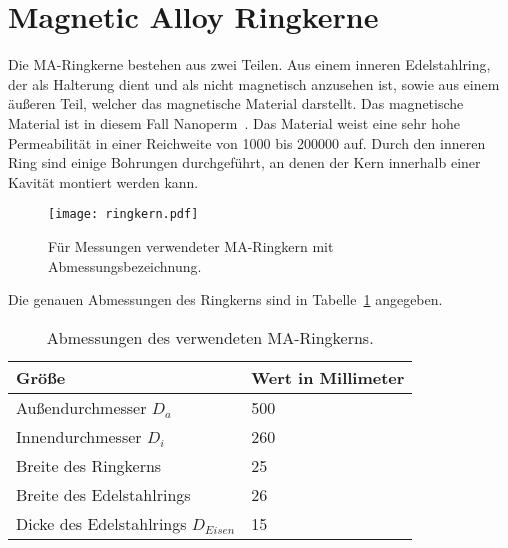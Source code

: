 \section{Magnetic Alloy Ringkerne}
Die MA-Ringkerne bestehen aus zwei Teilen. Aus einem inneren Edelstahlring, der als Halterung dient und als nicht magnetisch anzusehen ist, sowie aus einem \"au\ss{}eren Teil, welcher das magnetische Material darstellt. Das magnetische Material ist in diesem Fall Nanoperm~\citep{magnetec2018}. Das Material weist eine sehr hohe Permeabilit\"at in einer Reichweite von 1000 bis 200000 auf. Durch den inneren Ring sind einige Bohrungen durchgef\"uhrt, an denen der Kern innerhalb einer Kavit\"at montiert werden kann.
\begin{figure}[htb]
	\centering
	\texttt{[image: ringkern.pdf]}
	\caption{F\"ur Messungen verwendeter MA-Ringkern mit Abmessungsbezeichnung.}
	\label{fig:ringkern}
\end{figure}
\par
Die genauen Abmessungen des Ringkerns sind in Tabelle~\ref{tab:ringkern} angegeben.
\begin{table}[htb]
	\centering
	\begin{tabular}{| l | l |}
		\hline
		Gr\"o\ss{}e & Wert in Millimeter \\ \hline
		Au\ss{}endurchmesser $D_a$ & 500 \\
		Innendurchmesser $D_i$ & 260 \\
		Breite des Ringkerns & 25 \\
		Breite des Edelstahlrings & 26 \\
		Dicke des Edelstahlrings $D_{Eisen}$ & 15 \\ \hline
	\end{tabular}
	\caption{Abmessungen des verwendeten MA-Ringkerns.}
	\label{tab:ringkern}
\end{table}
